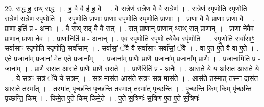 \documentclass[17pt]{extarticle}
\begin{document}
29. सद्ध॑ ह॒ सथ् सद्ध॑ । . ह॒ वै वै ह॑ ह॒ वै । . वै स॒त्रेण॑ स॒त्रेण॒ वै वै स॒त्रेण॑ । . स॒त्रेण॑ स्पृणोति स्पृणोति स॒त्रेण॑ स॒त्रेण॑ स्पृणोति । . स्पृ॒णो॒ति॒ प्रा॒णाः प्रा॒णाः स्पृ॑णोति स्पृणोति प्रा॒णाः । . प्रा॒णा वै वै प्रा॒णाः प्रा॒णा वै । . प्रा॒णा इति॑ प्र - अ॒नाः । . वै सथ् सद् वै वै सत् । . सत् प्रा॒णान् प्रा॒णान् थ्सथ् सत् प्रा॒णान् । . प्रा॒णा ने॒वैव प्रा॒णान् प्रा॒णा ने॒व । . प्रा॒णानिति॑ प्र - अ॒नान् । . ए॒व स्पृ॑णोति स्पृणो त्ये॒वैव स्पृ॑णोति । . स्पृ॒णो॒ति॒ सर्वा॑साꣳ॒॒ सर्वा॑साꣳ स्पृणोति स्पृणोति॒ सर्वा॑साम् । . सर्वा॑सां॒ ॅवै वै सर्वा॑साꣳ॒॒ सर्वा॑सां॒ ॅवै । . वा ए॒त ए॒ते वै वा ए॒ते । . ए॒ते प्र॒जाना᳚म् प्र॒जाना॑ मे॒त ए॒ते प्र॒जाना᳚म् । . प्र॒जाना᳚म् प्रा॒णैः प्रा॒णैः प्र॒जाना᳚म् प्र॒जाना᳚म् प्रा॒णैः । . प्र॒जाना॒मिति॑ प्र - जाना᳚म् । . प्रा॒णै रा॑सत आसते प्रा॒णैः प्रा॒णै रा॑सते । . प्रा॒णैरिति॑ प्र - अ॒नैः । . आ॒स॒ते॒ ये य आ॑सत आसते॒ ये । . ये स॒त्रꣳ स॒त्रं ॅये ये स॒त्रम् । . स॒त्र मास॑त॒ आस॑ते स॒त्रꣳ स॒त्र मास॑ते । . आस॑ते॒ तस्मा॒त् तस्मा॒ दास॑त॒ आस॑ते॒ तस्मा᳚त् । . तस्मा᳚त् पृच्छन्ति पृच्छन्ति॒ तस्मा॒त् तस्मा᳚त् पृच्छन्ति । . पृ॒च्छ॒न्ति॒ किम् किम् पृ॑च्छन्ति पृच्छन्ति॒ किम् । . किमे॒त ए॒ते किम् किमे॒ते । . ए॒ते स॒त्रिणः॑ स॒त्रिण॑ ए॒त ए॒ते स॒त्रिणः॑ । \newline
\end{document}
